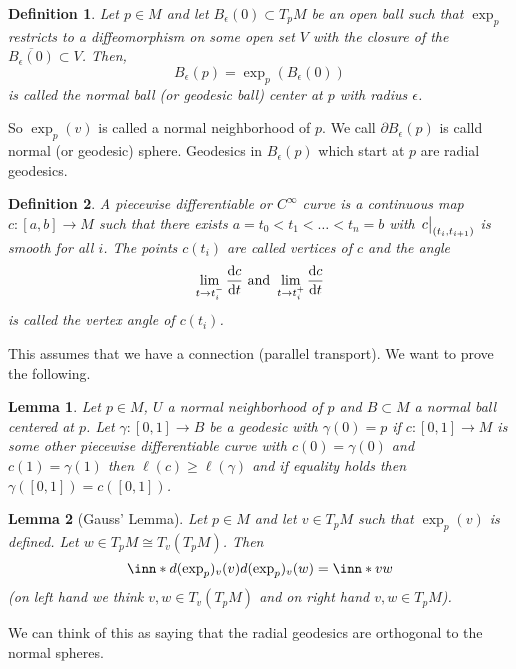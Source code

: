 \documentclass[a4paper]{article}
\newtheorem*{defn}{Definition}
\newtheorem*{lem}{Lemma}
\begin{document}
\begin{defn}
  Let $p \in M$ and let $B_{\epsilon}(0) \subset T_pM$ be an open ball such that $\exp_p$ restricts to a diffeomorphism on some open set $V$ with the closure of the $\overline{B_{\epsilon}(0)} \subset V$. Then, 
  \[
    B_{\epsilon}(p) = \exp_p (B_{\epsilon}(0))
  \]
  is called the normal ball (or geodesic ball) center at $p$ with radius $\epsilon$.
\end{defn}
 
So $\exp_p(v)$ is called a normal neighborhood of $p$. We call $\partial B_{\epsilon}(p)$ is calld normal (or geodesic) sphere. Geodesics in $B_{\epsilon}(p)$ which start at $p$ are radial geodesics.

\begin{defn}
  A piecewise differentiable or $C^{\infty}$ curve is a continuous map $c:[a,b] \rightarrow M$ such that there exists $a= t_0 < t_1 < \dots < t_n = b$ with $\eval{c}_{(t_i, t_{i+1})}$ is smooth for all $i$. The points $c(t_i)$ are called vertices of $c$ and the angle
  \[
    \lim_{t \rightarrow t_i^{-}} \dv{c}{t} \text{ and } \lim_{t \rightarrow t_i^+} \dv{c}{t}
  \]
  is called the vertex angle of $c(t_i)$. 
\end{defn}
This assumes that we have a connection (parallel transport). We want to prove the following.

\begin{lem}
  Let $p \in M$, $U$ a normal neighborhood of $p$ and $B \subset M$ a normal ball centered at $p$. Let $\gamma: [0,1] \rightarrow B$ be a geodesic with $\gamma(0) = p$ if $c:[0,1] \rightarrow M$ is some other piecewise differentiable curve with $c(0) = \gamma(0)$ and $c(1) = \gamma(1)$ then $\ell(c) \geq \ell(\gamma)$ and if equality holds then $\gamma([0,1]) = c([0,1])$.
\end{lem}

\begin{lem}[Gauss' Lemma]
  Let $p \in M$ and let $v \in T_pM$ such that $\exp_p(v)$ is defined. Let $w \in T_pM \cong T_v(T_pM)$. Then 
  \[
    \inn*{d(\exp_p)_v(v)}{d(\exp_p)_v(w)} = \inn*{v}{w}
  \]
  (on left hand we think $v,w \in T_v(T_pM)$ and on right hand $v,w \in T_pM$).
\end{lem}
We can think of this as saying that the radial geodesics are orthogonal to the normal spheres.
\end{document}
